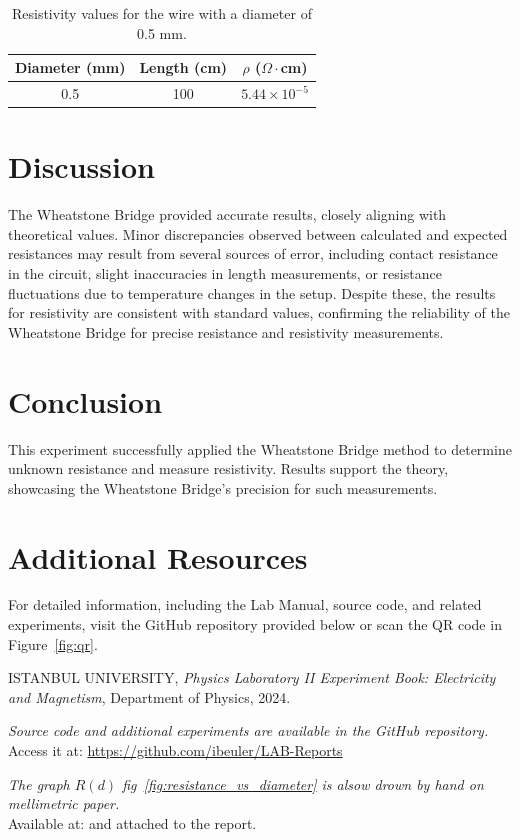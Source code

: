 \documentclass[journal]{IEEEtran}
\begin{document}
\begin{table}[H]
\centering
\begin{tabular}{ccc}
\hline
Diameter (mm) & Length (cm) & $\rho$ ($\Omega\cdot$cm)\\
\hline
0.5 & 100 & \(5.44 \times 10^{-5}\) \\ %
\hline
\end{tabular}
\caption{Resistivity values for the wire with a diameter of 0.5 mm.}
\label{tab:resistivity}
\end{table}

\section{Discussion}
The Wheatstone Bridge provided accurate results, closely aligning with theoretical values. Minor discrepancies observed between calculated and expected resistances may result from several sources of error, including contact resistance in the circuit, slight inaccuracies in length measurements, or resistance fluctuations due to temperature changes in the setup. Despite these, the results for resistivity are consistent with standard values, confirming the reliability of the Wheatstone Bridge for precise resistance and resistivity measurements.

\section{Conclusion}
This experiment successfully applied the Wheatstone Bridge method to determine unknown resistance and measure resistivity. Results support the theory, showcasing the Wheatstone Bridge's precision for such measurements.


\section{Additional Resources}
For detailed information, including the Lab Manual, source code, and related experiments, visit the GitHub repository provided below or scan the QR code in 
Figure~\ref{fig:qr}.

\begin{thebibliography}{9}
    ISTANBUL UNIVERSITY, 
    \textit{Physics Laboratory II Experiment Book: Electricity and Magnetism}, 
    Department of Physics, 2024.

    \textit{Source code and additional experiments are available in the GitHub repository.} \\ 
    Access it at: \url{https://github.com/ibeuler/LAB-Reports}

    \textit{The graph $R(d)$ fig~\ref{fig:resistance_vs_diameter} is alsow 
    drown by hand on mellimetric paper.}\\
    Available at: \url{}
    and attached to the report.
\end{thebibliography}
\end{document}
